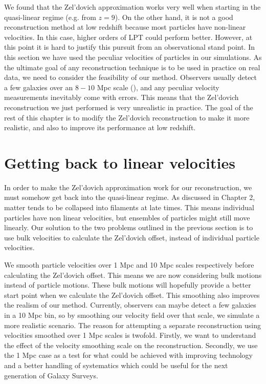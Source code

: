 We found that the Zel'dovich approximation works very well when starting in the quasi-linear regime (e.g. from $z=9$). On the other hand, it is not a good reconstruction method at low redshift because most particles have non-linear velocities. In this case, higher orders of LPT could perform better. However, at this point it is hard to justify this pursuit from an observational stand point. In this section we have used the peculiar velocities of particles in our simulations. As the ultimate goal of any reconstruction technique is to be used in practice on real data, we need to consider the feasibility of our method. Observers usually detect a few galaxies over an $8-10$ Mpc scale (\cite{dodelson2003modern}), and any peculiar velocity measurements inevitably come with errors. This means that the Zel'dovich reconstruction we just performed is very unrealistic in practice. The goal of the rest of this chapter is to modify the Zel'dovich reconstruction to make it more realistic, and also to improve its performance at low redshift.

\section{Getting back to linear velocities}

In order to make the Zel'dovich approximation work for our reconstruction, we must somehow get back into the quasi-linear regime. As discussed in Chapter 2, matter tends to be collapsed into filaments at late times. This means individual particles have non linear velocities, but ensembles of particles might still move linearly. Our solution to the two problems outlined in the previous section is to use bulk velocities to calculate the Zel'dovich offset, instead of individual particle velocities.

We smooth particle velocities over 1 Mpc and 10 Mpc scales respectively before calculating the Zel'dovich offset. This means we are now considering bulk motions instead of particle motions. These bulk motions will hopefully provide a better start point when we calculate the Zel'dovich offset. This smoothing also improves the realism of our method. Currently, observers can maybe detect a few galaxies in a 10 Mpc bin, so by smoothing our velocity field over that scale, we simulate a more realistic scenario. The reason for attempting a separate reconstruction using velocities smoothed over 1 Mpc scales is twofold. Firstly, we want to understand the effect of the velocity smoothing scale on the reconstruction. Secondly, we use the 1 Mpc case as a test for what could be achieved with improving technology and a better handling of systematics which could be useful for the next generation of Galaxy Surveys.

